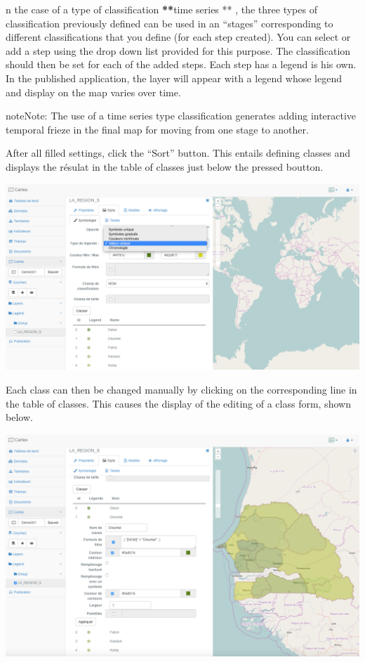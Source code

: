 \documentclass[letterpaper,10pt,english]{sphinxmanual}
\begin{document}
n the case of a type of classification {\color{red}\bfseries{}**}time series ** , the three types of classification previously defined can be used in an ``stages'' corresponding to different classifications that you define (for each step created). You can select or add a step using the drop down list provided for this purpose. The classification should then be set for each of the added steps. Each step has a legend is his own. In the published application, the layer will appear with a legend whose legend and display on the map varies over time.

\begin{notice}{note}{Note:}
The use of a time series type classification generates adding interactive temporal frieze in the final map for moving from one stage to another.
\end{notice}

After all filled settings, click the ``Sort'' button. This entails defining classes and displays the résulat in the table of classes just below the pressed boutton.

\includegraphics[width=1.000\linewidth]{layer-classes-table.png}

Each class can then be changed manually by clicking on the corresponding line in the table of classes. This causes the display of the editing of a class form, shown below.

\includegraphics[width=1.000\linewidth]{edit-indicator-class.png}
\end{document}
